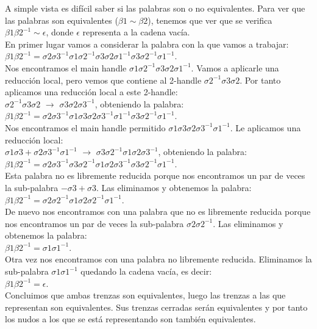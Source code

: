 A simple vista es difícil saber si las palabras son o no equivalentes. Para ver que las palabras son equivalentes ($\beta1 \sim \beta2$), tenemos que ver que se verifica $\beta1 \beta2^{-1} \sim \epsilon$, donde $\epsilon$ representa a la cadena vacía.\\

En primer lugar vamos a considerar la palabra con la que vamos a trabajar:\\
$\beta1 \beta2^{-1} =\sigma2\sigma3^{-1}\sigma1\sigma2^{-1}\sigma3\sigma2\sigma1^{-1}\sigma3\sigma2^{-1}\sigma1^{-1}$.\\

Nos encontramos el main handle $ \sigma1\sigma2^{-1}\sigma3\sigma2\sigma1^{-1} $. Vamos a aplicarle una reducción local, pero vemos que contiene al 2-handle $\sigma2^{-1}\sigma3\sigma2$. Por tanto aplicamos una reducción local a este 2-handle:\\
$\sigma2^{-1}\sigma3\sigma2$ $\rightarrow$ $\sigma3\sigma2\sigma3^{-1}$, obteniendo la palabra:\\
$\beta1 \beta2^{-1} =\sigma2\sigma3^{-1}\sigma1\sigma3\sigma2\sigma3^{-1}\sigma1^{-1}\sigma3\sigma2^{-1}\sigma1^{-1}$.\\

Nos encontramos el main handle permitido $\sigma1\sigma3\sigma2\sigma3^{-1}\sigma1^{-1}$. Le aplicamos una reducción local:\\ 
$\sigma1\sigma3+\sigma2\sigma3^{-1}\sigma1^{-1}$ $\rightarrow$ $\sigma3\sigma2^{-1}\sigma1\sigma2\sigma3^{-1}$, obteniendo la palabra:\\
$\beta1 \beta2^{-1} =\sigma2\sigma3^{-1}\sigma3\sigma2^{-1}\sigma1\sigma2\sigma3^{-1}\sigma3\sigma2^{-1}\sigma1^{-1}$.\\

Esta palabra no es libremente reducida porque nos encontramos un par de veces la sub-palabra $ -\sigma3+\sigma3 $. Las eliminamos y obtenemos la palabra:\\
$\beta1 \beta2^{-1} =\sigma2\sigma2^{-1}\sigma1\sigma2\sigma2^{-1}\sigma1^{-1}$.\\

De nuevo nos encontramos con una palabra que no es libremente reducida porque nos encontramos un par de veces la sub-palabra $ \sigma2\sigma2^{-1} $. Las eliminamos y obtenemos la palabra:\\
$\beta1 \beta2^{-1} =\sigma1\sigma1^{-1}$.\\

Otra vez nos encontramos con una palabra no libremente reducida. Eliminamos la sub-palabra $\sigma1\sigma1^{-1}$ quedando la cadena vacía, es decir:\\
$\beta1 \beta2^{-1} =\epsilon$.\\

Concluimos que ambas trenzas son equivalentes, luego las trenzas a las que representan son equivalentes. Sus trenzas cerradas serán equivalentes y por tanto los nudos a los que se está representando son también equivalentes.\\
